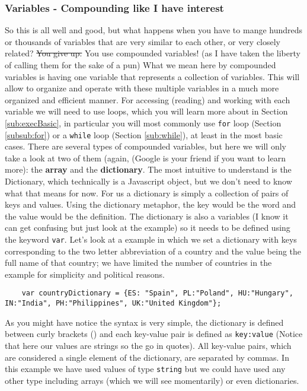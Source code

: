 \subsubsection{Variables - Compounding like I have interest} 
\label{subsub:array}
So this is all well and good, but what happens when you have to mange hundreds or thousands of variables that are very similar to each other, or very closely related? \sout{You give up.} You use compounded variables! (as I have taken the liberty of calling them for the sake of a pun)
What we mean here by compounded variables is having one variable that represents a collection of variables. This will allow to organize and operate with these multiple variables in a much more organized and efficient manner. For accessing (reading) and working with each variable we will need to use loops, which you will learn more about in Section \ref{sub:execBasic}, in particular you will most commonly use \texttt{for} loop (Section \ref{subsub:for}) or a \texttt{while} loop (Section \ref{sub:while}), at least in the most basic cases. 
There are several types of compounded variables, but here we will only take a look at two of them (again, (Google is your friend if you want to learn more): the \textbf{array} and the \textbf{dictionary}.
The most intuitive to understand is the Dictionary, which technically is a Javascript object, but we don't need to know what that means for now. For us a dictionary is simply a collection of pairs of keys and values. Using the dictionary metaphor, the key would be the word and the value would be the definition. The dictionary is also a variables (I know it can get confusing but just look at the example) so it needs to be defined using the keyword \texttt{var}.
Let's look at a example in which we set a dictionary with keys corresponding to the two letter abbreviation of a country and the value being the full name of that country; we have limited the number of countries in the example for simplicity and political reasons.

\begin{lstlisting}
    var countryDictionary = {ES: "Spain", PL:"Poland", HU:"Hungary", IN:"India", PH:"Philippines", UK:"United Kingdom"}; 
\end{lstlisting}
As you might have notice the syntax is very simple, the dictionary is defined between curly brackets ({}) and each key-value pair is defined as \texttt{key:value} (Notice that here our values are strings so the go in quotes). All key-value pairs, which are considered a single element of the dictionary, are separated by commas. In this example we have used values of type \texttt{string} but we could have used any other type including arrays (which we will see momentarily) or even dictionaries.

